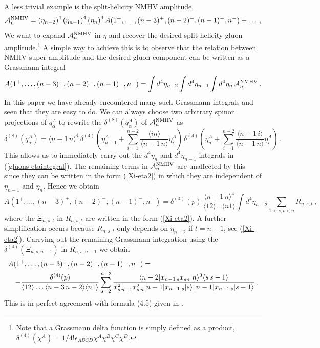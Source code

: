 \documentclass[12pt]{article}
\def \be  {\begin{equation}}
\def \ee  {\end{equation}}
\def \ba  {\begin{eqnarray}}
\def \ea  {\end{eqnarray}}
\newcommand \vev [1] {\langle{#1}\rangle}
\def\l<{\langle}\def\r>{\rangle}
\begin{document}
{A less trivial example is the split-helicity NMHV amplitude,
\be \label{app-expansion} {\cal A}^{\rm NMHV}_{n} =
\left(\eta_{n-2}\right)^4 \left(\eta_{n-1}\right)^4 \left(\eta_{n}\right)^4
A(1^{+},\ldots,(n-3)^{+},(n-2)^{-},(n-1)^{-},n^{-}) + \ldots\,, \ee
We want to  expand ${\cal A}^{\rm NMHV}_{n}$ in $\eta$ and recover the desired split-helicity gluon amplitude.\footnote{Note that a Grassmann delta function is simply defined as a product,
$\delta^{(4)}(\chi^{A}) = {1}/{4!} \epsilon_{ABCD} \chi^{A} \chi^{B} \chi^{C} \chi^{D}$.}
A simple way to achieve this is to observe that the relation between
NMHV super-amplitude and the desired gluon component can be written as
a Grassmann integral
\be \label{gluons-etaintegral}
A(1^{+},\ldots,(n-3)^{+},(n-2)^{-},(n-1)^{-},n^{-}) = \int d^{4}\eta_{n-2} \int d^{4}\eta_{n-1} \int d^{4}\eta_{n} \,{\cal A}^{\rm NMHV}_{n}\,.
\ee
In this paper we have already encountered many such Grassmann integrals and seen that they are easy to do.
We can always choose two arbitrary spinor projections of $q^{A}_{\alpha}$ to rewrite the $\delta^{(8)}(q^{A}_{\alpha})$ of ${\cal A}^{\rm NMHV}_{n}$ as
\be \label{app-delta8}
\delta^{(8)}(q^{A}_{\alpha}) =
 \vev{n-1 \,n}^4 \,
\delta^{(4)}\left( \eta_{n-1}^{A} + \sum_{i=1}^{n-2} \frac{\vev{i n}}{\vev{n-1\,n}} \eta_{i}^{A} \right) \,
\delta^{(4)} \left( \eta_{n}^{A} + \sum_{i=1}^{n-2} \frac{\vev{n-1 \,i}}{\vev{n-1\,n}} \eta_{i}^{A} \right)\,.
\ee
This allows us to immediately carry out the $d^{4}\eta_{n}$ and $d^{4}\eta_{n-1}$ integrals in (\ref{gluons-etaintegral}). The remaining terms in ${\cal A}^{\rm NMHV}_{n}$ are unaffected by this since they
can be written in the form (\ref{Xi-eta2}) in which they are independent of $\eta_{n-1}$ and $\eta_{n}$.
Hence we obtain
\be
A(1^{+},\ldots,(n-3)^{+},(n-2)^{-},(n-1)^{-},n^{-}) = \delta^{(4)}(p)\,\frac{ \vev{n-1 \,n}^4}{\vev{12}\ldots \vev{n1}} \int d^{4}\eta_{n-2} \sum_{1<s,t<n} R_{n;s,t}\,,
\ee
where the $\Xi_{n;s,t}$ in $R_{n;s,t}$ are written in the form (\ref{Xi-eta2}).
A further simplification occurs because $R_{n;s,t}$ only depends on $\eta_{n-2}$ if $t=n-1$, see (\ref{Xi-eta2}). Carrying out the remaining Grassmann integration using the $\delta^{(4)}(\Xi_{n;s,n-1})$ in $R_{n;s,n-1}$ we obtain
\ba
A(1^{+},\ldots,(n-3)^{+},(n-2)^{-},(n-1)^{-},n^{-}) &=&   \nonumber \\
&& \hspace{-7 cm} -\frac{\delta^{(4)}(p)}{\vev{12}\ldots
\vev{n-3\,n-2} \l< n1\r>}  \sum_{s=2}^{n-3}\frac{\langle
n-2|x_{n-1\,s}x_{sn}|n\rangle^3 \vev{s\,s-1}} {x_{s\,n-1}^2
x_{s\,n}^2 \lbrack n-1 | x_{n-1,s} |s\rangle\, \lbrack n-1 |
x_{n-1\,s}|s-1\rangle}\,. \ea This is in perfect agreement with
formula (4.5) given in \cite{Britto:2005dg}.

}
\end{document}
